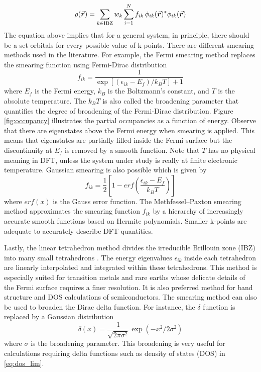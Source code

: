 \begin{equation} 
	\rho({\va*{r}}) = \sum_{k \in \text{IBZ}} w_k \sum_{i=1}^N f_{ik}\, \phi_{ik}(\va*{r})^* \phi_{ik}(\va*{r})
\end{equation}
The equation above implies that for a  general system, in principle, there should be a  set orbitals for every possible value of k-points. There are different smearing methods used in the literature. For example, the Fermi smearing method replaces the smearing function using Fermi-Dirac distribution \citep{Dirac1926,Fermi1926}
\begin{equation}
    f_{ik} = \frac{1}{\exp[(\epsilon_{ik} - E_f)/k_B T] + 1}
\end{equation}
where $E_f$ is the Fermi energy, $k_B$ is the Boltzmann's constant, and $T$ is the absolute temperature. The $k_B T$ is also called the broadening parameter that quantifies the degree of broadening of the Fermi-Dirac distribution. Figure \ref{fig:occupancy} illustrates the partial occupancies as a function of energy. Observe that there are eigenstates above the Fermi energy when smearing is applied. This means that eigenstates are partially filled inside the Fermi surface but the discontinuity at $E_f$ is removed by a smooth function. Note that $T$ has no physical meaning in DFT, unless the  system under study is really at finite electronic temperature. Gaussian smearing is also possible which is given by \citep{Fu1983}
\begin{equation}
    f_{ik} = \frac{1}{2} \left[1-erf\left(\frac{\epsilon_{ik} - E_f}{k_B T} \right)\right]
\end{equation}
where $erf(x)$ is the Gauss error function. The Methfessel–Paxton smearing method \citep{Methfessel1989}  approximates  the smearing function $f_{ik}$ by a hierarchy of increasingly accurate smooth functions based on Hermite polynomials. Smaller k-points are adequate to accurately describe DFT quantities. 

Lastly, the linear tetrahedron method divides the irreducible Brillouin zone (IBZ) into many small tetrahedrons \citep{Bloechl1994a}. The energy eigenvalues $\epsilon_{ik}$ inside each tetrahedron are  linearly
interpolated and integrated within these tetrahedrons. This method is especially suited for  transition metals and rare earths whose delicate details of the Fermi surface requires a finer resolution. It  is also preferred method for band structure and DOS calculations of semiconductors. The smearing method can also be used to broaden the Dirac delta function. For instance, the $\delta$ function is replaced by a Gaussian distribution
\begin{equation}
    \delta(x) = \frac{1}{\sqrt{2 \pi \sigma^2}} \exp(-x^2/2\sigma^2)
\end{equation}
where $\sigma$ is the broadening parameter. This broadening  is very useful for calculations requiring delta functions such as density of states (DOS) in \eqref{eq:dos_lim}.

